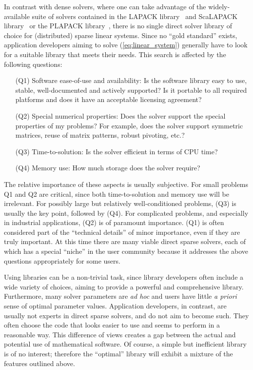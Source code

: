 \documentclass[acmtoms,acmnow]{acmtrans2m}
\begin{document}
In contrast with dense solvers, where one can take advantage of the
widely-available suite of solvers contained in the LAPACK
library~\cite{lapack-guide} and ScaLAPACK
library~\cite{scalapack-guide} or the PLAPACK
library~\cite{alpatov97plapack}, there is no single direct solver
library of choice for (distributed) sparse linear systems. Since no
``gold standard'' exists, application developers aiming to solve
(\ref{eq:linear_system}) generally have to look for a suitable
library that meets their needs. This search is affected by the
following questions:
\begin{enumerate}
\item[(Q1)] Software ease-of-use and availability: Is the software library easy to use,
stable, well-documented and actively supported?  
Is it portable to all required platforms and 
does it have an acceptable licensing agreement?
\item[(Q2)] Special numerical properties:  Does the solver support the special properties of my problems?
For example, does the solver support symmetric matrices, reuse of
matrix patterns, robust pivoting, etc.?
\item[(Q3)] Time-to-solution: Is the solver efficient in terms of CPU time?
\item[(Q4)] Memory use: How much storage does the solver require?
\end{enumerate}
The relative importance of these aspects is usually subjective. For small
problems Q1 and Q2 are critical, since both time-to-solution and memory use
will be irrelevant.
For possibly large but relatively well-conditioned problems, (Q3) is usually the key point, followed
by (Q4). For complicated problems, and especially in industrial
applications, (Q2) is of paramount importance. (Q1) is often
considered part of the ``technical details'' of minor importance,
even if they are truly important.  At this time there are many viable
direct sparse solvers, each of which has a special ``niche'' in the
user community because it addresses the above questions
appropriately for some users.

Using libraries can be a non-trivial task, since library developers
often include a wide variety of choices, aiming to provide a
powerful and comprehensive library. Furthermore, many solver
parameters are \textit{ad hoc} and users have little \textit{a
priori} sense of optimal parameter values.  Application developers,
in contrast, are usually not experts in direct sparse solvers, and
do not aim to become such. They often choose the code that looks
easier to use and seems to perform in a reasonable way. This
difference of views creates a gap between the actual and potential
use of mathematical software. Of course, a simple but inefficient
library is of no interest; therefore the ``optimal'' library will
exhibit a mixture of the features outlined above.
\end{document}

